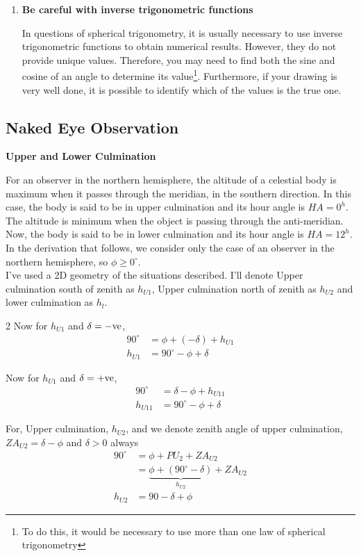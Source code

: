 \documentclass[a4paper,12pt]{extarticle}
\begin{document}
\begin{enumerate}
	\item \textbf{Be careful with inverse trigonometric functions}
	
	In questions of spherical trigonometry, it is usually necessary to use inverse trigonometric functions to obtain numerical results. However, they do not provide unique values. Therefore, you may need to find both the sine and cosine of an angle to determine its value\footnote{To do this, it would be necessary to use more than one law of spherical trigonometry}. Furthermore, if your drawing is very well done, it is possible to identify which of the values is the true one.
\end{enumerate}
\subsection{Naked Eye Observation}

\textsf{\textbf{Upper and Lower Culmination}}

For an observer in the northern hemisphere, the altitude of a celestial body is maximum when it passes through the meridian, in the southern direction. In this case, the body is said to be in upper culmination and its hour angle is $HA= 0^h$. The altitude is minimum when the object is passing through the anti-meridian. Now, the body is said to be in lower culmination and its hour angle is $HA = 12^h$. In the derivation that follows, we consider only the case of an observer in the
northern hemisphere, so $\phi \geq 0^\circ$.\\

I've used a 2D geometry of the situations described. I'll denote Upper culmination south of zenith as $h_{U1}$, Upper culmination north of zenith as $h_{U2}$ and lower culmination as $h_l$.
\begin{multicols}{2}
	Now for $h_{U1}$ and $\delta=-\rm ve$,
	\begin{align*}
		90^\circ &=\phi+ (-\delta)+ h_{U1}\\
		h_{U1} &= 90^\circ-\phi+\delta 
	\end{align*} 
	
	Now for $h_{U1}$ and $\delta=+\rm ve$,
	\begin{align*}
		90^\circ &=\delta-\phi + h_{U11}\\
		h_{U11} &= 90^\circ-\phi+\delta 
	\end{align*} 
\end{multicols}
For, Upper culmination, $h_{U2}$, and we denote zenith angle of upper culmination, $ZA_{U2}=\delta-\phi$ and $\delta>0$ always
\begin{align*}
	90^\circ &= \phi +PU_2+ZA_{U2}\\
	&= \underbrace{\phi+ (90^\circ-\delta)}_{h_{U2}}+ZA_{U2}\\
	h_{U2} &=90-\delta +\phi
\end{align*}
\end{document}
